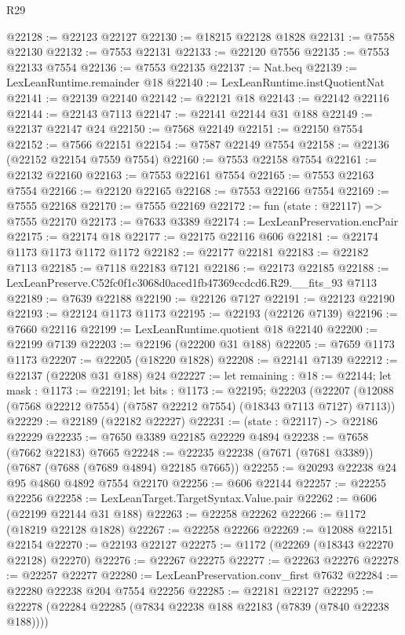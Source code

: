 \begin{lexlean}{R29}
\begin{coremodule}
@22128 := @22123 @22127
@22130 := @18215 @22128 @1828
@22131 := @7558 @22130
@22132 := @7553 @22131
@22133 := @22120 @7556
@22135 := @7553 @22133 @7554
@22136 := @7553 @22135
@22137 := Nat.beq
@22139 := LexLeanRuntime.remainder @18
@22140 := LexLeanRuntime.instQuotientNat
@22141 := @22139 @22140
@22142 := @22121 @18
@22143 := @22142 @22116
@22144 := @22143 @7113
@22147 := @22141 @22144 @31 @188
@22149 := @22137 @22147 @24
@22150 := @7568 @22149
@22151 := @22150 @7554
@22152 := @7566 @22151
@22154 := @7587 @22149 @7554
@22158 := @22136 (@22152 @22154 @7559 @7554)
@22160 := @7553 @22158 @7554
@22161 := @22132 @22160
@22163 := @7553 @22161 @7554
@22165 := @7553 @22163 @7554
@22166 := @22120 @22165
@22168 := @7553 @22166 @7554
@22169 := @7555 @22168
@22170 := @7555 @22169
@22172 := fun (state : @22117) => @7555 @22170
@22173 := @7633 @3389
@22174 := LexLeanPreservation.encPair
@22175 := @22174 @18
@22177 := @22175 @22116 @606
@22181 := @22174 @1173 @1173 @1172 @1172
@22182 := @22177 @22181
@22183 := @22182 @7113
@22185 := @7118 @22183 @7121
@22186 := @22173 @22185
@22188 := LexLeanPreserve.C52fc0f1c3068d0aced1fb47369ccdcd6.R29.__fits_93 @7113
@22189 := @7639 @22188
@22190 := @22126 @7127
@22191 := @22123 @22190
@22193 := @22124 @1173 @1173
@22195 := @22193 (@22126 @7139)
@22196 := @7660 @22116
@22199 := LexLeanRuntime.quotient @18 @22140
@22200 := @22199 @7139
@22203 := @22196 (@22200 @31 @188)
@22205 := @7659 @1173 @1173
@22207 := @22205 (@18220 @1828)
@22208 := @22141 @7139
@22212 := @22137 (@22208 @31 @188) @24
@22227 := let remaining : @18 := @22144;
  let mask : @1173 := @22191;
  let bits : @1173 := @22195;
  @22203 (@22207 (@12088 (@7568 @22212 @7554) (@7587 @22212 @7554) (@18343 @7113 @7127) @7113))
@22229 := @22189 (@22182 @22227)
@22231 := (state : @22117) -> @22186 @22229
@22235 := @7650 @3389 @22185 @22229 @4894
@22238 := @7658 (@7662 @22183) @7665
@22248 := @22235 @22238 (@7671 (@7681 @3389)) (@7687 (@7688 (@7689 @4894) @22185 @7665))
@22255 := @20293 @22238 @24 @95 @4860 @4892 @7554 @22170
@22256 := @606 @22144
@22257 := @22255 @22256
@22258 := LexLeanTarget.TargetSyntax.Value.pair
@22262 := @606 (@22199 @22144 @31 @188)
@22263 := @22258 @22262
@22266 := @1172 (@18219 @22128 @1828)
@22267 := @22258 @22266
@22269 := @12088 @22151 @22154
@22270 := @22193 @22127
@22275 := @1172 (@22269 (@18343 @22270 @22128) @22270)
@22276 := @22267 @22275
@22277 := @22263 @22276
@22278 := @22257 @22277
@22280 := LexLeanPreservation.conv_first @7632
@22284 := @22280 @22238 @204 @7554 @22256
@22285 := @22181 @22127
@22295 := @22278 (@22284 @22285 (@7834 @22238 @188 @22183 (@7839 (@7840 @22238 @188))))

\end{coremodule}
\end{lexlean}
